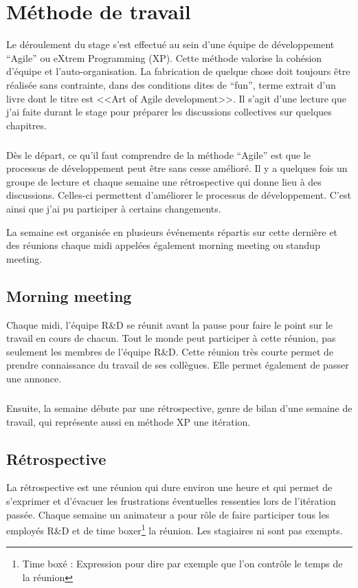 \section{Méthode de travail}

Le déroulement du stage s'est effectué au sein d'une équipe de développement ``Agile'' ou eXtrem Programming (XP).
Cette méthode valorise la cohésion d'équipe et l'auto-organisation. 
La fabrication de quelque chose doit toujours être réalisée sans contrainte, dans des conditions dites de ``fun'', terme extrait d'un livre dont le titre est <<Art of Agile development>>. 
Il s'agit d'une lecture que j'ai faite durant le stage pour préparer les discussions collectives sur quelques chapitres. 

\subparagraph*{}
Dès le départ, ce qu’il faut comprendre de la méthode ``Agile'' est que le processus de développement peut être sans cesse amélioré. 
Il y a quelques fois un groupe de lecture et chaque semaine une rétrospective qui donne lieu à des discussions. 
Celles-ci permettent d’améliorer le processus de développement.
C’est ainsi que j'ai pu participer à certains changements.

La semaine est organisée en plusieurs événements répartis sur cette dernière et des réunions chaque midi appelées également morning meeting ou standup meeting.

\subsection{Morning meeting}

Chaque midi, l'équipe R\&D se réunit avant la pause pour faire le point sur le travail en cours de chacun. Tout le monde peut participer à cette réunion, pas seulement les membres de l'équipe R\&D. Cette réunion très courte permet de prendre connaissance du travail de ses collègues. Elle permet également de passer une annonce.

\subparagraph*{}
Ensuite, la semaine débute par une rétrospective, genre de bilan d’une semaine de travail, qui représente aussi en méthode XP une itération. 

\subsection{Rétrospective}

La rétrospective est une réunion qui dure environ une heure et qui permet de s’exprimer et d’évacuer les frustrations éventuelles ressenties lors de l’itération passée.
Chaque semaine un animateur a pour rôle de faire participer tous les employés R\&D et de time boxer\footnote{Time boxé : Expression pour dire par exemple que l’on contrôle le temps de la réunion} la réunion. Les stagiaires ni sont pas exempts. 

